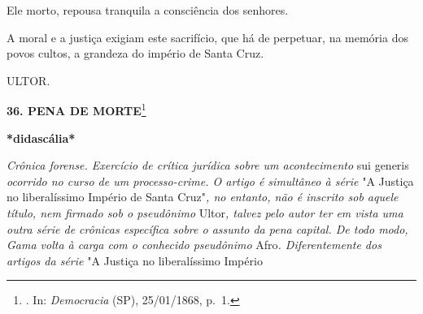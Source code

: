 Ele morto, repousa tranquila a consciência dos senhores.

A moral e a justiça exigiam este sacrifício, que há de perpetuar, na
memória dos povos cultos, a grandeza do império de Santa Cruz.

ULTOR.

\textbf{36. PENA DE MORTE}\footnote{. In: \emph{Democracia} (SP),
  25/01/1868, p.~1.}

\textbf{*didascália*}

\emph{Crônica forense. Exercício de crítica jurídica sobre um
acontecimento} sui generis \emph{ocorrido no curso de um processo-crime.
O artigo é simultâneo à série} "A Justiça no liberalíssimo Império de
Santa Cruz"\emph{, no entanto, não é inscrito sob aquele título, nem
firmado sob o pseudônimo} Ultor\emph{, talvez pelo autor ter em vista
uma outra série de crônicas específica sobre o assunto da pena capital.
De todo modo, Gama volta à carga com o conhecido pseudônimo} Afro\emph{.
Diferentemente dos artigos da série} "A Justiça no liberalíssimo Império
